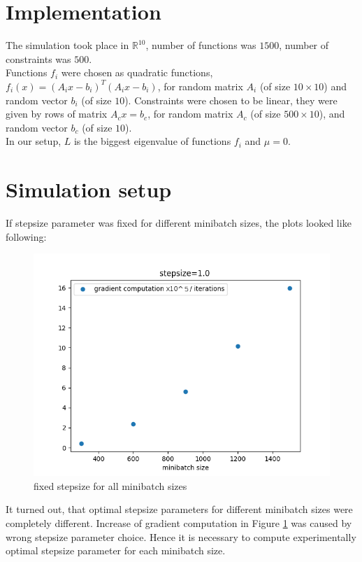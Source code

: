 \documentclass[11pt]{book}
\newcommand{\R}{\mathbb{R}}
\begin{document}
\section{Implementation}

The simulation took place in $\R^{10}$, number of functions was $1500$, number of constraints was $500$.\\

Functions $f_i$ were chosen as quadratic functions, $f_i(x) = (A_ix-b_i)^T(A_ix-b_i)$, for random matrix $A_i$ (of size $10 \times 10$) and random vector $b_i$ (of size $10$). Constraints were chosen to be linear, they were given by rows of matrix $A_cx=b_c$, for random matrix $A_c$ (of size $500 \times 10$), and random vector $b_c$ (of size $10$).\\

In our setup, $L$ is the biggest eigenvalue of functions $f_i$ and $\mu=0$.

\section{Simulation setup}

If stepsize parameter was fixed for different minibatch sizes, the plots looked like following:

\begin{figure}[H]
	\centering
	\includegraphics[width=.7\linewidth]{fixed_stepsize.png}
	\caption{fixed stepsize for all minibatch sizes}
	\label{fig:fixed stepsize}
\end{figure}

It turned out, that optimal stepsize parameters for different minibatch sizes were completely different. Increase of gradient computation in Figure \ref{fig:fixed stepsize} was caused by wrong stepsize parameter choice. Hence it is necessary to compute experimentally optimal stepsize parameter for each minibatch size.\\
\end{document}
